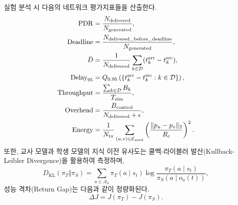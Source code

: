 실험 분석 시 다음의 네트워크 평가지표들을 산출한다.
\begin{align}
\mathrm{PDR} &= \frac{N_{\mathrm{delivered}}}{N_{\mathrm{generated}}}, \\
\mathrm{Deadline} &= \frac{N_{\mathrm{delivered\_before\_deadline}}}{N_{\mathrm{generated}}}, \\
\bar{D} &= \frac{1}{N_{\mathrm{delivered}}} \sum_{k \in \mathcal{D}} (t_k^{\mathrm{arr}} - t_k^{\mathrm{src}}), \\
\mathrm{Delay}_{95} &= Q_{0.95} \left( \{t_k^{\mathrm{arr}} - t_k^{\mathrm{src}} : k \in \mathcal{D}\} \right), \\
\mathrm{Throughput} &= \frac{\sum_{k \in \mathcal{D}} B_k}{T_{\mathrm{sim}}}, \\
\mathrm{Overhead} &= \frac{B_{\mathrm{control}}}{N_{\mathrm{delivered}} + \epsilon}, \\
\mathrm{Energy} &= \frac{1}{N_{\mathrm{tx}}} \sum_{(u,v) \in \mathcal{E}_{\mathrm{used}}} \left( \frac{\|p_u - p_v\|_2}{R_c} \right)^2.
\end{align}
또한, 교사 모델과 학생 모델의 지식 이전 유사도는 쿨백-라이블러 발산(Kullback-Leibler Divergence)을 활용하여 측정하며,
\begin{equation}
    D_{\mathrm{KL}}(\pi_T \Vert \pi_S) = \sum_{a \in \mathcal{A}_u} \pi_T(a \mid s_t) \log \frac{\pi_T(a \mid s_t)}{\pi_S(a \mid o_u(t))},
\end{equation}
성능 격차(Return Gap)는 다음과 같이 정량화된다.
\begin{equation}
    \Delta J = J(\pi_T) - J(\pi_S).
\end{equation}
